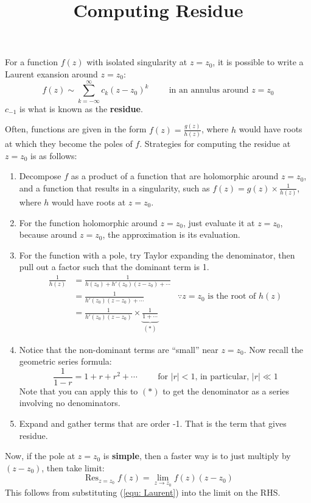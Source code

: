 \documentclass[a4paper]{article}
\title{Computing Residue}
\author{}
\date{}
\newcommand{\res}{\mathop{\mathrm{Res}}}
\begin{document}
\maketitle
For a function $f(z)$ with isolated singularity at $z=z_0$, it is possible to write a Laurent exansion around $z = z_0$:
\begin{equation}
    f(z) \sim \sum_{k=-\infty}^{\infty} c_k (z-z_0)^k \hspace{1cm} \text{in an annulus around } z = z_0
    \label{equ: Laurent}
\end{equation}
$c_{-1}$ is what is known as the \textbf{residue}.

Often, functions are given in the form $f(z) = \frac{g(z)}{h(z)}$, where $h$ would have roots at which they become the poles of $f$.
Strategies for computing the residue at $z=z_0$ is as follows:
\begin{enumerate}
    \item Decompose $f$ as a product of a function that are holomorphic around $z=z_0$,
        and a function that results in a singularity, such as $f(z) = g(z) \times \frac{1}{h(z)}$,
        where $h$ would have roots at $z=z_0$.
    \item For the function holomorphic around $z=z_0$, just evaluate it at $z=z_0$, because around $z=z_0$, the approximation is its evaluation.
    \item For the function with a pole, try Taylor expanding the denominator, then pull out a factor such that the dominant term is 1.
        \begin{align*}
            \frac{1}{h(z)} &= \frac{1}{h(z_0) + h'(z_0) (z-z_0) + \cdots} \\
            &= \frac{1}{h'(z_0) (z-z_0) + \cdots} &\because z=z_0\text{ is the root of } h(z)\\
            &= \frac{1}{h'(z_0)(z-z_0)} \times \underbrace{\frac{1}{1 + \cdots}}_{(*)}
        \end{align*}
    \item Notice that the non-dominant terms are ``small'' near $z = z_0$. Now recall the geometric series formula: \begin{equation}
            \frac{1}{1-r} = 1 + r + r^2 + \cdots \hspace{1cm} \text{for } |r| < 1 \text{, in particular, } |r| \ll 1
        \end{equation}
        Note that you can apply this to $(*)$ to get the denominator as a series involving no denominators.
    \item Expand and gather terms that are order -1. That is the term that gives residue.
\end{enumerate}
Now, if the pole at $z=z_0$ is \textbf{simple}, then a faster way is to just multiply by $(z-z_0)$, then take limit:
\begin{equation}
    \res_{z=z_0} f(z) = \lim_{z\rightarrow z_0} f(z) (z-z_0)
\end{equation}
This follows from substituting (\ref{equ: Laurent}) into the limit on the RHS.
\end{document}
